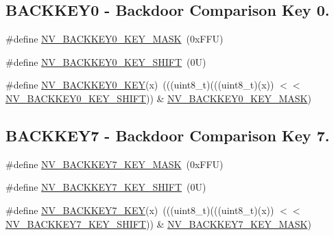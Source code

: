 \subsection*{B\+A\+C\+K\+K\+E\+Y0 -\/ Backdoor Comparison Key 0.}
\begin{DoxyCompactItemize}
\item 
\#define \mbox{\hyperlink{group___n_v___register___masks_gafa0e31ca33d445d47d2fd89785e4ec9b}{N\+V\+\_\+\+B\+A\+C\+K\+K\+E\+Y0\+\_\+\+K\+E\+Y\+\_\+\+M\+A\+SK}}~(0x\+F\+F\+U)
\item 
\#define \mbox{\hyperlink{group___n_v___register___masks_ga381e2b0a778da31fa6c795550e71aed8}{N\+V\+\_\+\+B\+A\+C\+K\+K\+E\+Y0\+\_\+\+K\+E\+Y\+\_\+\+S\+H\+I\+FT}}~(0\+U)
\item 
\#define \mbox{\hyperlink{group___n_v___register___masks_ga1806932e2ff643e0bd9d9718dd0921a4}{N\+V\+\_\+\+B\+A\+C\+K\+K\+E\+Y0\+\_\+\+K\+EY}}(x)~(((uint8\+\_\+t)(((uint8\+\_\+t)(x)) $<$$<$ \mbox{\hyperlink{group___n_v___register___masks_ga381e2b0a778da31fa6c795550e71aed8}{N\+V\+\_\+\+B\+A\+C\+K\+K\+E\+Y0\+\_\+\+K\+E\+Y\+\_\+\+S\+H\+I\+FT}})) \& \mbox{\hyperlink{group___n_v___register___masks_gafa0e31ca33d445d47d2fd89785e4ec9b}{N\+V\+\_\+\+B\+A\+C\+K\+K\+E\+Y0\+\_\+\+K\+E\+Y\+\_\+\+M\+A\+SK}})
\end{DoxyCompactItemize}
\subsection*{B\+A\+C\+K\+K\+E\+Y7 -\/ Backdoor Comparison Key 7.}
\begin{DoxyCompactItemize}
\item 
\#define \mbox{\hyperlink{group___n_v___register___masks_gac3f2bc7dd55b7951d70a5d1fcb6552b8}{N\+V\+\_\+\+B\+A\+C\+K\+K\+E\+Y7\+\_\+\+K\+E\+Y\+\_\+\+M\+A\+SK}}~(0x\+F\+F\+U)
\item 
\#define \mbox{\hyperlink{group___n_v___register___masks_gad6bef74e61e792dfa5b7d195e4ce5620}{N\+V\+\_\+\+B\+A\+C\+K\+K\+E\+Y7\+\_\+\+K\+E\+Y\+\_\+\+S\+H\+I\+FT}}~(0\+U)
\item 
\#define \mbox{\hyperlink{group___n_v___register___masks_ga2dbc4f6480af3ebaeeaf328a7f394c9f}{N\+V\+\_\+\+B\+A\+C\+K\+K\+E\+Y7\+\_\+\+K\+EY}}(x)~(((uint8\+\_\+t)(((uint8\+\_\+t)(x)) $<$$<$ \mbox{\hyperlink{group___n_v___register___masks_gad6bef74e61e792dfa5b7d195e4ce5620}{N\+V\+\_\+\+B\+A\+C\+K\+K\+E\+Y7\+\_\+\+K\+E\+Y\+\_\+\+S\+H\+I\+FT}})) \& \mbox{\hyperlink{group___n_v___register___masks_gac3f2bc7dd55b7951d70a5d1fcb6552b8}{N\+V\+\_\+\+B\+A\+C\+K\+K\+E\+Y7\+\_\+\+K\+E\+Y\+\_\+\+M\+A\+SK}})
\end{DoxyCompactItemize}
